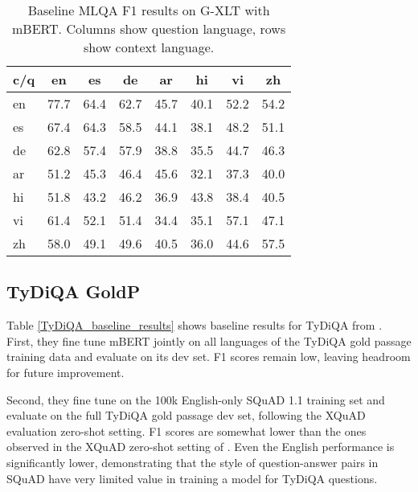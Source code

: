 \documentclass[11pt]{article}
\begin{document}
\begin{table}[ht]
\centering
\begin{adjustbox}{max width=\columnwidth}
\begin{tabular}{l|ccccccc}
\toprule
c/q & en   & es   & de   & ar   & hi   & vi   & zh   \\ \midrule
en  & 77.7 & 64.4 & 62.7 & 45.7 & 40.1 & 52.2 & 54.2 \\
es  & 67.4 & 64.3 & 58.5 & 44.1 & 38.1 & 48.2 & 51.1 \\
de  & 62.8 & 57.4 & 57.9 & 38.8 & 35.5 & 44.7 & 46.3 \\
ar  & 51.2 & 45.3 & 46.4 & 45.6 & 32.1 & 37.3 & 40.0 \\
hi  & 51.8 & 43.2 & 46.2 & 36.9 & 43.8 & 38.4 & 40.5 \\
vi  & 61.4 & 52.1 & 51.4 & 34.4 & 35.1 & 57.1 & 47.1 \\
zh  & 58.0 & 49.1 & 49.6 & 40.5 & 36.0 & 44.6 & 57.5 \\ \bottomrule
\end{tabular}
\end{adjustbox}
\caption{Baseline MLQA F1 results on G-XLT with mBERT. Columns show question language, rows show context language.}
\label{tab:mlqa_zero-shot_baseline_mbert}
\end{table}

\subsection{TyDiQA GoldP}

Table \ref{TyDiQA_baseline_results} shows baseline results for TyDiQA from \citet{tydiqa}. First, they fine tune mBERT jointly on all languages of the
TyDiQA gold passage training data and evaluate on its dev set. F1 scores remain low, leaving headroom for future improvement.

Second, they fine tune on the 100k English-only
SQuAD 1.1 training set and evaluate on the full
TyDiQA gold passage dev set, following the
XQuAD evaluation zero-shot setting. F1 scores are somewhat lower than the ones observed in the XQuAD zero-shot setting of \citet{Artetxe:etal:2019}. Even the English performance is significantly lower, demonstrating
that the style of question-answer pairs in SQuAD
have very limited value in training a model for
TyDiQA questions.
\end{document}
